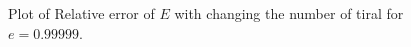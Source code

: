 \documentclass[10pt]{article}
\begin{document}
\begin{figure}[hbt]
  \centering
    \caption{ \label{fig:6} Plot of Relative error of $E$ with changing the number of tiral for $e = 0.99999$.}
\end{figure}
\end{document}
